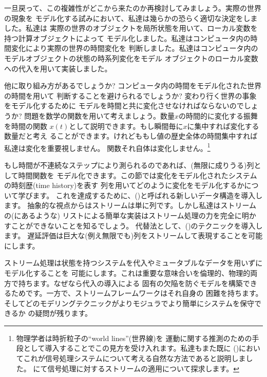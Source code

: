 一旦戻って、この複雑性がどこから来たのか再検討してみましょう。実際の世界の現象を
モデル化する試みにおいて、私達は幾らかの恐らく適切な決定をしました。私達は
実際の世界のオブジェクトを局所状態を用いて、ローカル変数を持つ計算オブジェクトによって
モデル化しました。私達はコンピュータ内の時間変化により実際の世界の時間変化を
判断しました。私達はコンピュータ内のモデルオブジェクトの状態の時系列変化をモデル
オブジェクトのローカル変数への代入を用いて実装しました。



他に取り組み方があるでしょうか? コンピュータ内の時間をモデル化された世界の時間を用いて
判断することを避けられるでしょうか? 変わり行く世界の事象をモデル化するために
モデルを時間と共に変化させなければならないのでしょうか?
問題を数学の関数を用いて考えましょう。数量\( x \)の時間的に変化する振舞を時間の関数
\( x(t) \)として説明できます。もし瞬間毎に\( x \)に集中すれば変化する数量だと考え
ることができます。けれどももし値の歴史全体の時間集中すれば私達は変化を重要視しません。
関数それ自体は変化しません。\footnote{物理学者は時折粒子の``world lines''(世界線)を
運動に関する推測のための手段として導入することでこの見方を受け入れます。私達もまた既に
()においてこれが信号処理システムについて考える自然な方法であると説明しました。
にて信号処理に対するストリームの適用について探求します。}


もし時間が不連続なステップにより測られるのであれば、(無限に成りうる)列として時間関数を
モデル化できます。この節では変化をモデル化されたシステムの時刻歴(time history)を表す
列を用いてどのように変化をモデル化するかについて学びます。
これを達成するために、()と呼ばれる新しいデータ構造を導入します。
抽象的な視点からはストリームは単に列です。しかし私達はストリームの(にあるような)
リストによる簡単な実装はストリーム処理の力を完全に明かすことができないことを知るでしょう。
代替法として、()のテクニックを導入します。
遅延評価は巨大な(例え無限でも)列をストリームして表現することを可能にします。



ストリーム処理は状態を持つシステムを代入やミュータブルなデータを用いずにモデル化することを
可能にします。これは重要な意味合いを倫理的、物理的両方で持ちます。なぜなら代入の導入による
固有の欠陥を防ぐモデルを構築できるためです。一方で、ストリームフレームワークはそれ自身の
困難を持ちます。そしてどのモデリングテクニックがよりモジュラでより簡単にシステムを保守できるか
の疑問が残ります。



